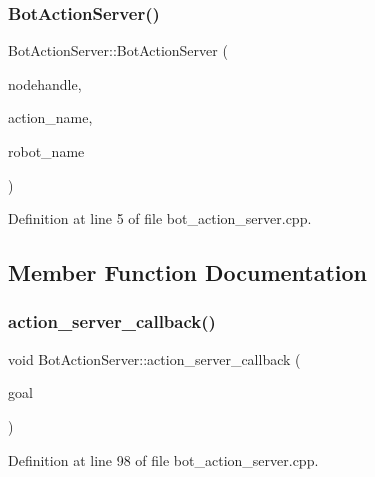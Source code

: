 \subsubsection{\texorpdfstring{Bot\+Action\+Server()}{BotActionServer()}}
{\footnotesize\ttfamily Bot\+Action\+Server\+::\+Bot\+Action\+Server (\begin{DoxyParamCaption}\item[{ros\+::\+Node\+Handle $\ast$}]{nodehandle,  }\item[{std\+::string}]{action\+\_\+name,  }\item[{std\+::string}]{robot\+\_\+name }\end{DoxyParamCaption})}



Definition at line 5 of file bot\+\_\+action\+\_\+server.\+cpp.



\subsection{Member Function Documentation}
\mbox{\label{class_bot_action_server_a48f2c8231440b5057b2685c319d83515}} 
\subsubsection{\texorpdfstring{action\+\_\+server\+\_\+callback()}{action\_server\_callback()}}
{\footnotesize\ttfamily void Bot\+Action\+Server\+::action\+\_\+server\+\_\+callback (\begin{DoxyParamCaption}\item[{const actionlib\+::\+Simple\+Action\+Server$<$ bot\+\_\+msgs\+::\+Move\+Bot\+Action $>$\+::Goal\+Const\+Ptr \&}]{goal }\end{DoxyParamCaption})}



Definition at line 98 of file bot\+\_\+action\+\_\+server.\+cpp.

\mbox{\label{class_bot_action_server_af24acb7dc4e73c24a4c913fd6a521bf0}} 
